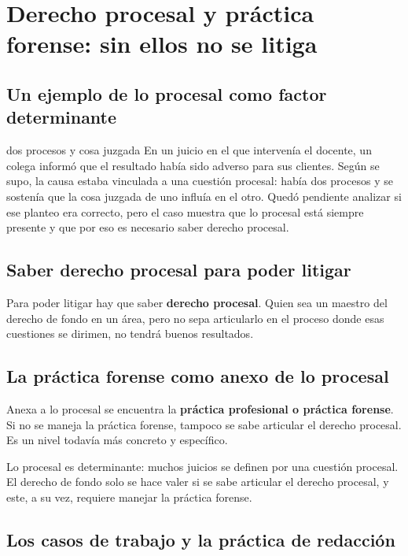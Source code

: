 \documentclass[12pt,oneside]{book}
\begin{document}
\section{Derecho procesal y práctica forense: sin ellos no se litiga}

\subsection{Un ejemplo de lo procesal como factor determinante}

\begin{example}{dos procesos y cosa juzgada}
En un juicio en el que intervenía el docente, un colega informó que el resultado había sido adverso para sus clientes. Según se supo, la causa estaba vinculada a una cuestión procesal: había dos procesos y se sostenía que la cosa juzgada de uno influía en el otro. Quedó pendiente analizar si ese planteo era correcto, pero el caso muestra que lo procesal está siempre presente y que por eso es necesario saber derecho procesal.
\end{example}

\subsection{Saber derecho procesal para poder litigar}

Para poder litigar hay que saber \textbf{derecho procesal}. Quien sea un maestro del derecho de fondo en un área, pero no sepa articularlo en el proceso donde esas cuestiones se dirimen, no tendrá buenos resultados.

\subsection{La práctica forense como anexo de lo procesal}

Anexa a lo procesal se encuentra la \textbf{práctica profesional o práctica forense}. Si no se maneja la práctica forense, tampoco se sabe articular el derecho procesal. Es un nivel todavía más concreto y específico.

\begin{important}
Lo procesal es determinante: muchos juicios se definen por una cuestión procesal. El derecho de fondo solo se hace valer si se sabe articular el derecho procesal, y este, a su vez, requiere manejar la práctica forense.
\end{important}

\subsection{Los casos de trabajo y la práctica de redacción}
\end{document}
